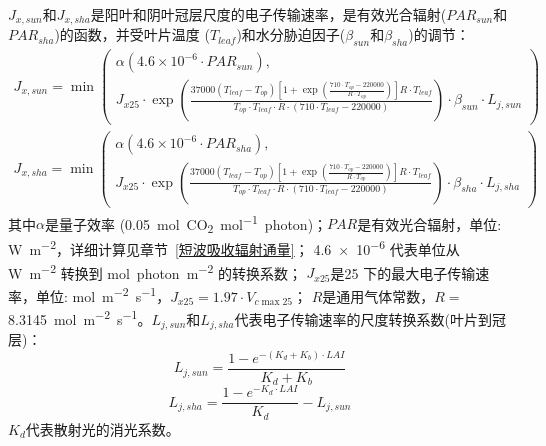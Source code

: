 $J_{x,sun}$和$J_{x,sha}$是阳叶和阴叶冠层尺度的电子传输速率，是有效光合辐射($PAR_{sun}$和$PAR_{sha}$)的函数，并受叶片温度 ($T_{leaf}$)和水分胁迫因子($\beta_{sun}$和$\beta_{sha}$)的调节：
\begin{equation}
\begin{aligned}
J_{x,sun}=\min \left(\begin{array}{c} \alpha\left(4.6 \times 10^{-6} \cdot PAR_{sun}\right), \\
  J_{x25} \cdot \exp\left(\frac{37000\left(T_{{leaf }}-T_{o p}\right)\left[1+\exp\left(\frac{710 \cdot T_{o p}-220000}
 {R \cdot T_{o p}}\right)\right]R \cdot T_{{leaf}}}{T_{o p} \cdot T_{{leaf }} \cdot R 
 \cdot \left(710 \cdot T_{{leaf }}-220000\right)}\right)\cdot \beta_{sun} \cdot L_{j,sun}  \end{array} \right)  
\end{aligned}
\end{equation}
\begin{equation}
\begin{aligned}
J_{x,sha}=\min \left(\begin{array}{c} \alpha\left(4.6 \times 10^{-6} \cdot PAR_{sha}\right), \\
  J_{x25} \cdot \exp\left(\frac{37000\left(T_{{leaf }}-T_{o p}\right)\left[1+\exp\left(\frac{710 \cdot T_{o p}-220000}
 {R \cdot T_{o p}}\right)\right]R \cdot T_{{leaf}}}{T_{o p} \cdot T_{{leaf }} \cdot R 
 \cdot \left(710 \cdot T_{{leaf }}-220000\right)}\right)\cdot \beta_{sha} \cdot L_{j,sha}  \end{array} \right)  
\end{aligned}
\end{equation}
其中$\alpha$是量子效率 (\qty{0.05}{mol.CO_2.mol^{-1}.photon})；$PAR$是有效光合辐射，单位: \unit{W.m^{-2}}，详细计算见章节~\ref{短波吸收辐射通量}；
\num{4.6e-6} 代表单位从 \unit{W.m^{-2}} 转换到 \unit{mol.photon.m^{-2}} 的转换系数；
$J_{x25}$是25 \textcelsius 下的最大电子传输速率，单位: \unit{mol.m^{-2}.s^{-1}}，$J_{x25}=1.97 \cdot V_{c \max 25}$； 
$R$是通用气体常数，$R=$ \qty{8.3145}{mol.m^{-2}.s^{-1}}。$L_{j,sun}$和$L_{j,sha}$代表电子传输速率的尺度转换系数(叶片到冠层)：
%
\begin{equation}\label{L_jsun}
L_{j,sun}=\frac{1-e^{-\left(K_{d}+K_{b}\right) \cdot LAI}}{K_{d}+K_{b}}
\end{equation}
\begin{equation}\label{L_jsha}
L_{j,sha}=\frac{1-e^{-K_{d}\cdot LAI}}{K_{d}} - L_{j,sun}
\end{equation}
$K_{d}$代表散射光的消光系数。

